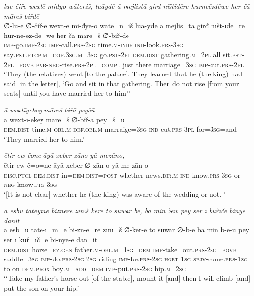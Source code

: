 \ea \label{KŠ.87}
\textit{lue čiře wextē miđyo wāteniš, luāydē ā mejlistā girđ nīštīdēre hurneēzdēwe her čā māreš biřdē} \\ 
\gll ∅-lu-e ∅-čiř-e wext-ē mi-đye-o wāte=n=iš luā-ydē ā mejlis=tā girđ nīšt-īdē=re hur-ne-ēz-dē=we her čā māre=š ∅-biř-dē \\ 
 \textsc{imp-}go.\textsc{imp-}\textsc{2sg} \textsc{imp-}call\textsc{.prs}-\textsc{2sg} time\textsc{.m}\textsc{-indf} \textsc{ind-}look\textsc{.prs}\textsc{-3sg} say\textsc{.pst}\textsc{.ptcp}\textsc{.m}\textsc{=cop}\textsc{.3sg}\textsc{.m}\textsc{=3sg} go\textsc{.pst}-\textsc{2pl} \textsc{dem.dist} gathering\textsc{.m}=\textsc{2pl} all sit\textsc{.pst}-\textsc{2pl}\textsc{=\textsc{povb}} \textsc{pvb-}\textsc{neg-}rise\textsc{.prs}-\textsc{2pl}\textsc{=compl} just there marriage\textsc{=3sg} \textsc{imp-}cut\textsc{.prs}-\textsc{2pl} \\ 
\glt `They (the relatives) went [to the palace]. They learned that he (the king) had said [in the letter], ‘Go and sit in that gathering. Then do not rise [from your seats] until you have married her to him.’'
\z 
 
\ea \label{KŠ.89}
\textit{ā wextīyekey māreš biřā peyšū} \\ 
\gll ā wext-ī-ekey māre=š ∅-biř-ā pey=š=ū \\ 
 \textsc{dem.dist} time\textsc{.m}\textsc{-obl}\textsc{.m}\textsc{-def}\textsc{.obl}\textsc{.m} marraige\textsc{=3sg} \textsc{ind-}cut\textsc{.prs}\textsc{-3pl} for\textsc{=3sg}=and \\ 
\glt `They married her to him.'
\z 
 
\ea \label{KŠ.91}
\textit{ētir ew čone āyā xeber zāno yā mezāno,} \\ 
\gll ētir ew č=o=ne āyā xeber ∅-zān-o yā me-zān-o \\ 
 \textsc{disc.ptcl} \textsc{dem.dist} in=\textsc{dem.dist}\textsc{=\textsc{post}} whether news\textsc{.dir}\textsc{.m} \textsc{ind-}know\textsc{.prs}\textsc{-3sg} or \textsc{neg-}know\textsc{.prs}\textsc{-3sg} \\ 
\glt `[It is not clear] whether he (the king) was aware of the wedding or not. '
\z 
 
\ea \label{KŠ.96}
\textit{ā esbū tāteyme biznere zīnīš kere to suwār be, bā min bew pey ser ī kuřīče binye dānit} \\ 
\gll ā esb=ū tāte-ī=m=e bi-zn-e=re zīnī=š ∅-ker-e to suwār ∅-b-e bā min b-e-ū pey ser ī kuř=īč=e bi-nye-e dān=it \\ 
 \textsc{dem.dist} horse\textsc{\textsc{=ez.gen}} father\textsc{.m}\textsc{-obl}\textsc{.m}\textsc{=\textsc{1sg}}\textsc{=dem} \textsc{imp-}take\_out\textsc{.prs}-\textsc{2sg}\textsc{=\textsc{povb}} saddle\textsc{=3sg} \textsc{imp-}do\textsc{.prs}-\textsc{2sg} \textsc{2sg} riding \textsc{imp-}be\textsc{.prs}-\textsc{2sg} \textsc{hort} \textsc{1sg} \textsc{sbjv-}come\textsc{.prs}\textsc{-\textsc{1sg}} to on \textsc{dem.prox} boy\textsc{.m}\textsc{=add}\textsc{=dem} \textsc{imp-}put\textsc{.prs}-\textsc{2sg} hip\textsc{.m}\textsc{=\textsc{2sg}} \\ 
\glt `‘Take my father’s horse out [of the stable], mount it [and] then I will climb [and] put the son on your hip.'
\z 
 
